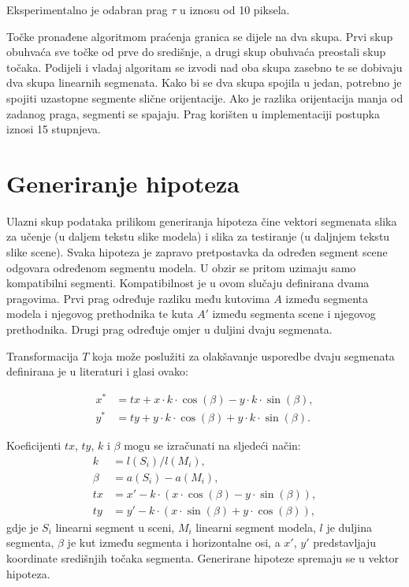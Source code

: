 \documentclass[lmodern, utf8, seminar, numeric]{fer}
\begin{document}
Eksperimentalno je odabran prag $\tau$ u iznosu od 10 piksela.

Točke pronađene algoritmom praćenja granica se dijele na dva skupa. Prvi skup
obuhvaća sve točke od prve do središnje, a drugi skup obuhvaća preostali skup
točaka. Podijeli i vladaj algoritam se izvodi nad oba skupa zasebno te se
dobivaju dva skupa linearnih segmenata. Kako bi se dva skupa spojila u jedan,
potrebno je spojiti uzastopne segmente slične orijentacije. Ako je razlika
orijentacija manja od zadanog praga, segmenti se spajaju. Prag korišten u
implementaciji postupka iznosi 15 stupnjeva.


\section{Generiranje hipoteza}
Ulazni skup podataka prilikom generiranja hipoteza čine vektori segmenata slika
za učenje (u daljem tekstu slike modela) i slika za testiranje (u daljnjem
tekstu slike scene). Svaka hipoteza je zapravo pretpostavka da određen segment
scene odgovara određenom segmentu modela. U obzir se pritom uzimaju samo
kompatibilni segmenti. Kompatibilnost je u ovom slučaju definirana dvama
pragovima. Prvi prag određuje razliku među kutovima $A$ između segmenta modela i
njegovog prethodnika te kuta $A'$ između segmenta scene i njegovog prethodnika.
Drugi prag određuje omjer u duljini dvaju segmenata.


Transformacija $T$ koja može poslužiti za olakšavanje usporedbe dvaju segmenata
definirana je u literaturi \citep{ayache2009hyper} i glasi ovako:

\begin{align}
x^{\ast} & = tx + x\cdot k\cdot \cos(\beta) - y\cdot k\cdot \sin(\beta), \\
y^{\ast} & = ty + y\cdot k\cdot \cos(\beta) + y\cdot k\cdot \sin(\beta).
\end{align}

Koeficijenti $tx$, $ty$, $k$ i $\beta$ mogu se izračunati na sljedeći način:
\begin{align}
k & = l(S_i)/l(M_i),\\
\beta & = a(S_i) - a(M_i),\\
tx & = x' - k\cdot ( x \cdot \cos(\beta) - y\cdot \sin(\beta)), \\
ty & = y' - k\cdot ( x \cdot \sin(\beta) + y\cdot \cos(\beta)),
\end{align}
gdje je $S_i$ linearni segment u sceni, $M_i$ linearni segment modela, $l$ je
duljina segmenta, $\beta$ je kut između segmenta i horizontalne osi, a $x'$, $y'$
predstavljaju koordinate središnjih točaka segmenta.
Generirane hipoteze spremaju se u vektor hipoteza.
\end{document}
